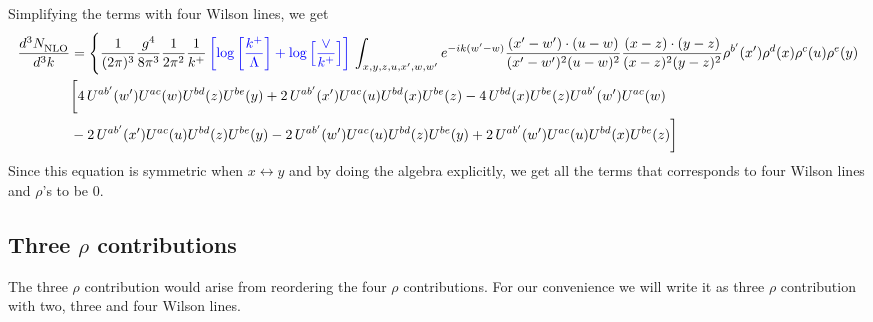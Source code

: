 \documentclass[aps,prd,amsmath,amssymb,nofootinbib]{revtex4-2}
\numberwithin{equation}{section}
\begin{document}
Simplifying the terms with four Wilson lines, we get
\begin{align}
       \frac{d^{3}N_{\rm NLO}^{\rm}}{d^{3}k}  & =  \Bigg\{\frac{1}{(2\pi)^{3}}\frac{g^{4}}{8\pi^{3}}\frac{1}{2\pi^{2}} \frac{1}{k^{+}}\,{\color{blue}\left[\log{\left[\frac{k^{+}}{\Lambda}\right]}+\log{\left[\frac{\vee}{k^{+}}\right]}\right]}\,\int_{x,y,z,u,x^{\prime},w,w^{\prime}}e^{-ik(w^{\prime}-w)}\frac{(x^{\prime}-w^{\prime})\cdot (u-w)}{(x^{\prime}-w^{\prime})^{2} (u-w)^{2}} \frac{(x-z)\cdot (y-z)}{(x-z)^{2}(y-z)^{2}}\rho^{b'}(x') \rho^{d}(x) \rho^{c}(u) \rho^{e}(y)\notag \\ & \bigg[4\,U^{ab'}(w')U^{ac}(w)U^{bd}(z)U^{be}(y)+2\,U^{ab'}(x')U^{ac}(u)U^{bd}(x)U^{be}(z)-4\,U^{bd}(x)U^{be}(z)U^{ab'}(w')U^{ac}(w)\notag \\ & -2\,U^{ab'}(x')U^{ac}(u)U^{bd}(z)U^{be}(y)-2\,U^{ab'}(w')U^{ac}(u)U^{bd}(z)U^{be}(y)+2\,U^{ab'}(w')U^{ac}(u)U^{bd}(x)U^{be}(z)\bigg]
\end{align}
Since this equation is symmetric when $x\leftrightarrow y$ and by doing the algebra explicitly, we get all the terms that corresponds to four Wilson lines and $\rho$'s to be $0$.
\subsection{Three $\rho$ contributions }
The three $\rho$ contribution would arise from reordering the four $\rho$ contributions. For our convenience we will write it as three $\rho$ contribution with two, three and four Wilson lines. 
\end{document}
